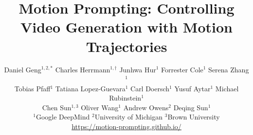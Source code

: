 \documentclass[10pt,twocolumn,letterpaper]{article}
\title{Motion Prompting: Controlling Video Generation with Motion Trajectories}
\author{
Daniel Geng$^{1,2,*}$ \hspace{0.2cm}
Charles Herrmann$^{1,\dagger}$ \hspace{0.2cm}
Junhwa Hur$^{1}$ \hspace{0.2cm}
Forrester Cole$^{1}$ \hspace{0.2cm}
Serena Zhang$^{1}$ \\
Tobias Pfaff$^{1}$ \hspace{0.2cm} 
Tatiana Lopez-Guevara$^{1}$ \hspace{0.2cm}
Carl Doersch$^{1}$ \hspace{0.2cm}  %
Yusuf Aytar$^{1}$ \hspace{0.2cm}
Michael Rubinstein$^{1}$ \\
Chen Sun$^{1,3}$ \hspace{0.2cm}
Oliver Wang$^{1}$ \hspace{0.2cm}
Andrew Owens$^{2}$ \hspace{0.2cm}
Deqing Sun$^{1}$
\vspace{0.2cm} \\
$^1$Google DeepMind \hspace{0.8cm}
$^2$University of Michigan \hspace{0.8cm}
$^3$Brown University
\vspace{0.2cm} \\
\url{https://motion-prompting.github.io/}
}
\begin{document}
\maketitle
    








 

{
    \small
    
    
}

\newpage


\end{document}
